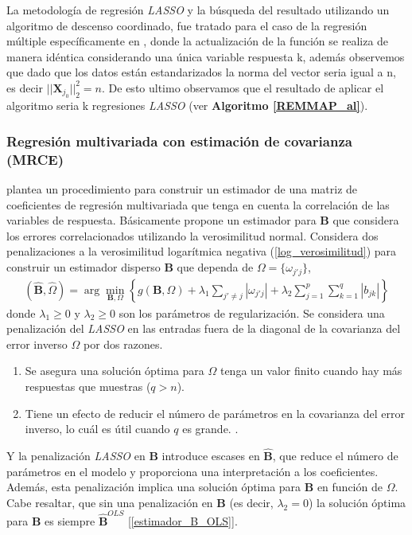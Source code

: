 \documentclass{article}
\newcommand{\X}{\mathbf{X}}
\newcommand{\B}{\mathbf{B}}
\begin{document}
La metodología de regresión \textit{LASSO} y la búsqueda del resultado utilizando un algoritmo de descenso coordinado, fue tratado para el caso de la regresión múltiple específicamente en \citep{mrce}, donde la actualización de la función se realiza de manera idéntica considerando una única variable respuesta k, además observemos que dado que los datos están estandarizados la norma del vector seria igual a n, es decir $||\X_{j_0}||^{2}_2=n$. De esto ultimo observamos que el resultado de aplicar el algoritmo seria k regresiones \textit{LASSO} (ver \textbf{Algoritmo \ref{REMMAP_al}}).

\subsubsection{Regresión multivariada con estimación de covarianza (MRCE)}
\cite{mrce} plantea un procedimiento para construir un estimador de una matriz de coeficientes de regresión multivariada que tenga en cuenta la correlación de las variables de respuesta. Básicamente propone un estimador para $\B$ que considera los errores correlacionados utilizando la verosimilitud normal. Considera dos penalizaciones a la verosimilitud logarítmica negativa (\ref{log_verosimilitud}) para construir un estimador disperso $\B$ que dependa de $\Omega=\{\omega_{j'j}\}$,
\begin{align}\label{log_verosimilitu_penalizado}
    (\hat{\B}, \hat{\Omega}) = \arg \min_{\B, \Omega} \left\{g(\B, \Omega)+\lambda_1\sum_{j'\neq j} |\omega_{j'j}| +\lambda_2\sum_{j=1}^p\sum_{k=1}^q|b_{jk}|\right\} 
\end{align}
donde $\lambda_1\geq 0$ y $\lambda_2\geq 0$ son los parámetros de regularización. Se considera una penalización del \textit{LASSO} en las entradas fuera de la diagonal de la covarianza del error inverso $\Omega$ por dos razones.
\begin{enumerate}
    \item Se asegura una solución óptima para $\Omega$ tenga un valor finito cuando hay más respuestas que muestras ($q>n$).
    \item Tiene un efecto de reducir el número de parámetros en la covarianza del error inverso, lo cuál es útil cuando $q$ es grande. \citep{Rothman_2008}.
\end{enumerate}
Y la penalización \textit{LASSO} en $\B$ introduce escases en $\hat{\B}$, que reduce el número de parámetros en el modelo y proporciona una interpretación a los coeficientes. Además, esta penalización implica una solución óptima para $\B$ en función de $\Omega$. Cabe resaltar, que sin una penalización en $\B$ (es decir, $\lambda_2=0$) la solución óptima para $\B$ es siempre $\hat{\B}^{OLS}$ [\ref{estimador_B_OLS}].\\
\end{document}
